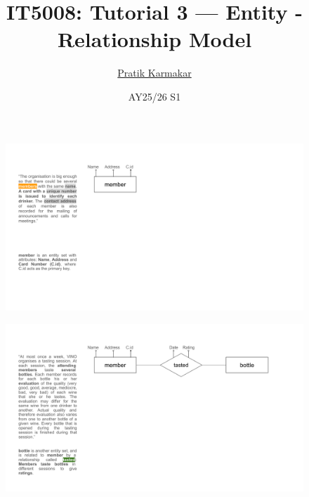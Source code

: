 \documentclass{beamer}
\title{IT5008: Tutorial 3 — Entity - Relationship Model}
\author{\href{https://pratik2358.github.io/}{Pratik Karmakar}}
\institute{School of Computing,\\ National University of Singapore}
\date{AY25/26 S1}
\begin{document}
\begin{frame}
  \titlepage
\end{frame}

\begin{frame}
    \begin{figure}
        \centering
        \includegraphics[width=1.1\linewidth]{tut_02_files/01.pdf}
    \end{figure}
\end{frame}

\begin{frame}
    \begin{figure}
        \centering
        \includegraphics[width=1.1\linewidth]{tut_02_files/02.pdf}
    \end{figure}
\end{frame}
\end{document}
